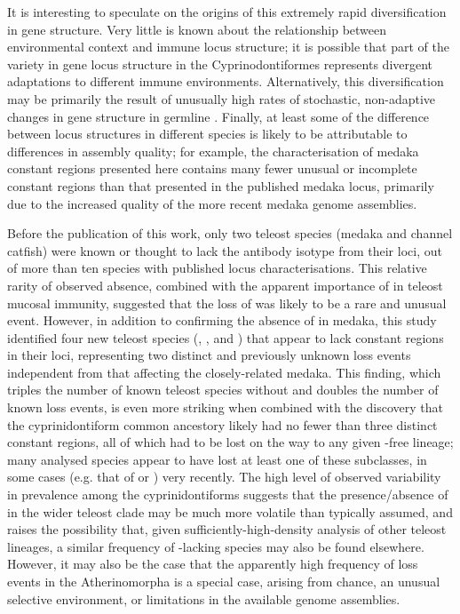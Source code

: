 It is interesting to speculate on the origins of this extremely rapid diversification in gene structure. Very little is known about the relationship between environmental context and immune locus structure; it is possible that part of the variety in \igh{} gene locus structure in the Cyprinodontiformes represents divergent adaptations to different immune environments. Alternatively, this diversification may be primarily the result of unusually high rates of stochastic, non-adaptive changes in gene structure in germline \igh{}. Finally, at least some of the difference between locus structures in different species is likely to be attributable to differences in assembly quality; for example, the characterisation of medaka constant regions presented here contains many fewer unusual or incomplete constant regions than that presented in the published medaka \igh{} locus, primarily due to the increased quality of the more recent medaka genome assemblies.

Before the publication of this work, only two teleost species (medaka and channel catfish) were known or thought to lack the  antibody isotype from their \igh{} loci, out of more than ten species with published locus characterisations. This relative rarity of observed absence, combined with the apparent importance of  in teleost mucosal immunity, suggested that the loss of  was likely to be a rare and unusual event. However, in addition to confirming the absence of  in medaka, this study identified four new teleost species (\nfu, ,  and ) that appear to lack  constant regions in their \igh{} loci, representing two distinct and previously unknown loss events independent from that affecting the closely-related medaka. This finding, which triples the number of known teleost species without  and doubles the number of known loss events, is even more striking when combined with the discovery that the cyprinidontiform common ancestory likely had no fewer than three distinct  constant regions, all of which had to be lost on the way to any given -free lineage; many analysed species appear to have lost at least one of these  subclasses, in some cases (e.g. that of \xma or ) very recently. The high level of observed variability in  prevalence among the cyprinidontiforms suggests that the presence/absence of  in the wider teleost clade may be much more volatile than typically assumed, and raises the possibility that, given sufficiently-high-density analysis of other teleost lineages, a similar frequency of -lacking species may also be found elsewhere. However, it may also be the case that the apparently high frequency of  loss events in the Atherinomorpha is a special case, arising from chance, an unusual selective environment, or limitations in the available genome assemblies.

